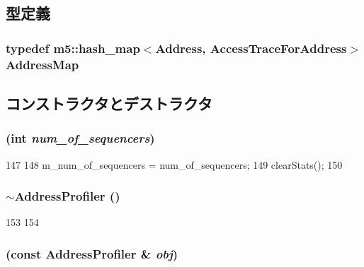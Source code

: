 \subsection{型定義}
\hypertarget{classAddressProfiler_a8a9f1225b5c1cb2d26e7cea035910b56}{
\subsubsection[{AddressMap}]{\setlength{\rightskip}{0pt plus 5cm}typedef m5::hash\_\-map$<${\bf Address}, {\bf AccessTraceForAddress}$>$ {\bf AddressMap}}}
\label{classAddressProfiler_a8a9f1225b5c1cb2d26e7cea035910b56}


\subsection{コンストラクタとデストラクタ}
\hypertarget{classAddressProfiler_af450d4ff37cb5d876e71ca5ed54b5488}{
\subsubsection[{AddressProfiler}]{ (int {\em num\_\-of\_\-sequencers})}}
\label{classAddressProfiler_af450d4ff37cb5d876e71ca5ed54b5488}



\begin{DoxyCode}
147 {
148     m_num_of_sequencers = num_of_sequencers;
149     clearStats();
150 }
\end{DoxyCode}
\hypertarget{classAddressProfiler_adc42b3cd6cc3b0daa903e7cb7f55e16f}{
\subsubsection[{$\sim$AddressProfiler}]{\setlength{\rightskip}{0pt plus 5cm}$\sim${\bf AddressProfiler} ()}}
\label{classAddressProfiler_adc42b3cd6cc3b0daa903e7cb7f55e16f}



\begin{DoxyCode}
153 {
154 }
\end{DoxyCode}
\hypertarget{classAddressProfiler_a34e17be12a9b21c77a0705bd32e8b453}{
\subsubsection[{AddressProfiler}]{ (const {\bf AddressProfiler} \& {\em obj})}}
\label{classAddressProfiler_a34e17be12a9b21c77a0705bd32e8b453}



